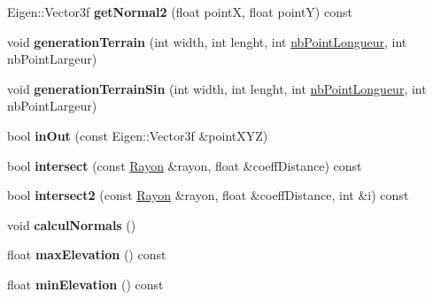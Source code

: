\begin{DoxyCompactItemize}
\item 
\hypertarget{class_terrain_a04748d931a306dcf2e48c8a643a2cee0}{}Eigen\+::\+Vector3f {\bfseries get\+Normal2} (float point\+X, float point\+Y) const \label{class_terrain_a04748d931a306dcf2e48c8a643a2cee0}

\item 
\hypertarget{class_terrain_aa516d3fc092357557b0e2fc1aa70648f}{}void {\bfseries generation\+Terrain} (int width, int lenght, int \hyperlink{class_terrain_a7a4093259732066a936d06873a498f08}{nb\+Point\+Longueur}, int nb\+Point\+Largeur)\label{class_terrain_aa516d3fc092357557b0e2fc1aa70648f}

\item 
\hypertarget{class_terrain_a8334e5e2ab753ec264302a73590bbb3e}{}void {\bfseries generation\+Terrain\+Sin} (int width, int lenght, int \hyperlink{class_terrain_a7a4093259732066a936d06873a498f08}{nb\+Point\+Longueur}, int nb\+Point\+Largeur)\label{class_terrain_a8334e5e2ab753ec264302a73590bbb3e}

\item 
\hypertarget{class_terrain_a1bb95c679e6a884c84e90ec6075263e7}{}bool {\bfseries in\+Out} (const Eigen\+::\+Vector3f \&point\+X\+Y\+Z)\label{class_terrain_a1bb95c679e6a884c84e90ec6075263e7}

\item 
\hypertarget{class_terrain_a527559f109af6561a7f7002d6112990a}{}bool {\bfseries intersect} (const \hyperlink{class_rayon}{Rayon} \&rayon, float \&coeff\+Distance) const \label{class_terrain_a527559f109af6561a7f7002d6112990a}

\item 
\hypertarget{class_terrain_a9df18366b85b01bad44fe68b8c4b7b34}{}bool {\bfseries intersect2} (const \hyperlink{class_rayon}{Rayon} \&rayon, float \&coeff\+Distance, int \&i) const \label{class_terrain_a9df18366b85b01bad44fe68b8c4b7b34}

\item 
\hypertarget{class_terrain_a17ba02c2234c8f789f62449e5a0267e7}{}void {\bfseries calcul\+Normals} ()\label{class_terrain_a17ba02c2234c8f789f62449e5a0267e7}

\item 
\hypertarget{class_terrain_a25c79b96398c2fdda8bd9ee0757d7fa5}{}float {\bfseries max\+Elevation} () const \label{class_terrain_a25c79b96398c2fdda8bd9ee0757d7fa5}

\item 
\hypertarget{class_terrain_ad4db67ba75a8c79b6da9fbd223ec0af0}{}float {\bfseries min\+Elevation} () const \label{class_terrain_ad4db67ba75a8c79b6da9fbd223ec0af0}


\end{DoxyCompactItemize}

